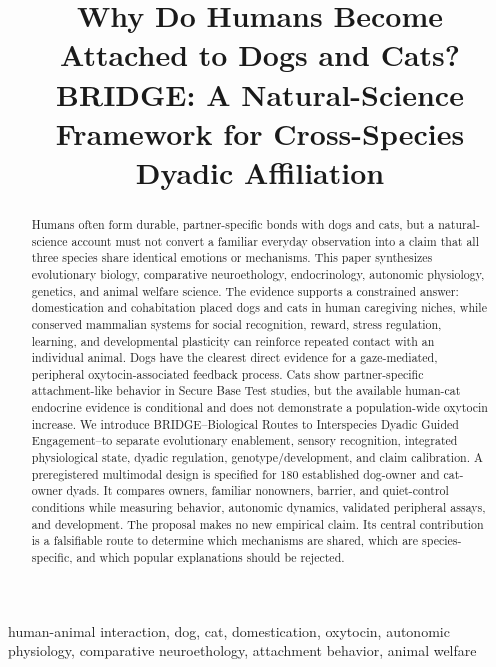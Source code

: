 \documentclass[conference]{IEEEtran}
\begin{document}
\title{Why Do Humans Become Attached to Dogs and Cats?\\
BRIDGE: A Natural-Science Framework for Cross-Species Dyadic Affiliation}

\author{}

\maketitle

\begin{abstract}
Humans often form durable, partner-specific bonds with dogs and cats, but a natural-science account must not convert a familiar everyday observation into a claim that all three species share identical emotions or mechanisms. This paper synthesizes evolutionary biology, comparative neuroethology, endocrinology, autonomic physiology, genetics, and animal welfare science. The evidence supports a constrained answer: domestication and cohabitation placed dogs and cats in human caregiving niches, while conserved mammalian systems for social recognition, reward, stress regulation, learning, and developmental plasticity can reinforce repeated contact with an individual animal. Dogs have the clearest direct evidence for a gaze-mediated, peripheral oxytocin-associated feedback process. Cats show partner-specific attachment-like behavior in Secure Base Test studies, but the available human-cat endocrine evidence is conditional and does not demonstrate a population-wide oxytocin increase. We introduce BRIDGE--Biological Routes to Interspecies Dyadic Guided Engagement--to separate evolutionary enablement, sensory recognition, integrated physiological state, dyadic regulation, genotype/development, and claim calibration. A preregistered multimodal design is specified for 180 established dog-owner and cat-owner dyads. It compares owners, familiar nonowners, barrier, and quiet-control conditions while measuring behavior, autonomic dynamics, validated peripheral assays, and development. The proposal makes no new empirical claim. Its central contribution is a falsifiable route to determine which mechanisms are shared, which are species-specific, and which popular explanations should be rejected.
\end{abstract}

\begin{IEEEkeywords}
human-animal interaction, dog, cat, domestication, oxytocin, autonomic physiology, comparative neuroethology, attachment behavior, animal welfare
\end{IEEEkeywords}
\end{document}
